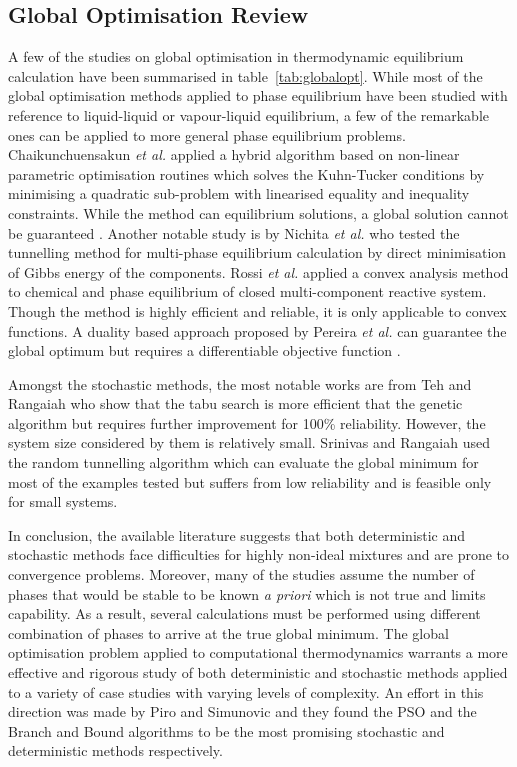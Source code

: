 	\subsection{Global Optimisation Review}
	 A few of the studies on global optimisation in thermodynamic equilibrium calculation have been summarised in table~\ref{tab:globalopt}. While most of the global optimisation methods applied to phase equilibrium have been studied with reference to liquid-liquid or vapour-liquid equilibrium, a few of the remarkable ones can be applied to more general phase equilibrium problems. Chaikunchuensakun \textit{et al.} \cite{Chaikunchuensakun:2002aa} applied a hybrid algorithm based on non-linear parametric optimisation routines which solves the Kuhn-Tucker conditions by minimising a quadratic sub-problem with linearised equality and inequality constraints. While the method can equilibrium solutions, a global solution cannot be guaranteed \cite{Zhang11}. Another notable study is by Nichita \textit{et al.} \cite{Nichita02} who tested the tunnelling method for multi-phase equilibrium calculation by direct minimisation of Gibbs energy of the components. Rossi \textit{et al.} \cite{ROSSI20111226} applied a convex analysis method to chemical and phase equilibrium of closed multi-component reactive system. Though the method is highly efficient and reliable, it is only applicable to convex functions. A duality based approach proposed by Pereira \textit{et al.} \cite{PEREIRA20101} can guarantee the global optimum but requires a differentiable objective function \cite{Zhang11}.

	 Amongst the stochastic methods, the most notable works are from Teh and Rangaiah \cite{Teh03} who show that the tabu search is more efficient that the genetic algorithm but requires further improvement for 100\% reliability. However, the system size considered by them is relatively small. Srinivas and Rangaiah \cite{Srinivas06} used the random tunnelling algorithm which can evaluate the global minimum for most of the examples tested but suffers from low reliability and is feasible only for small systems.

	 In conclusion, the available literature suggests that both deterministic and stochastic methods face difficulties for highly non-ideal mixtures and are prone to convergence problems. Moreover, many of the studies assume the number of phases that would be stable to be known \textit{a priori} which is not true and limits capability. As a result, several calculations must be performed using different combination of phases to arrive at the true global minimum. The global optimisation problem applied to computational thermodynamics warrants a more effective and rigorous study of both deterministic and stochastic methods applied to a variety of case studies with varying levels of complexity. An effort in this direction was made by Piro and Simunovic \cite{Piro16} and they found the PSO and the Branch and Bound algorithms to be the most promising stochastic and deterministic methods respectively.

